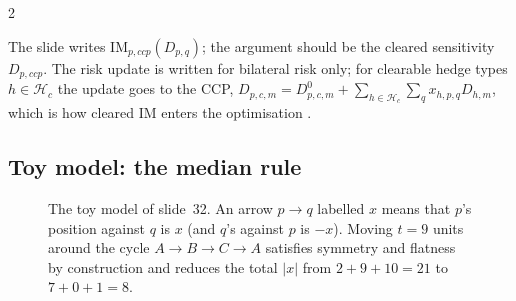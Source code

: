 \begin{paracol}{2}
\begin{coursenote}
The slide writes $\mathrm{IM}_{p,ccp}(D_{p,q})$; the argument should be the cleared sensitivity $D_{p,ccp}$. The
risk update is written for bilateral risk only; for clearable hedge types $h\in\mathcal H_c$ the update goes to the
CCP, $D_{p,c,m}=D^0_{p,c,m}+\sum_{h\in\mathcal H_c}\sum_qx_{h,p,q}D_{h,m}$, which is how cleared IM enters the
optimisation .
\end{coursenote}

\subsection{Toy model: the median rule}
\begin{figure}[ht]
\centering
{}
\caption{The toy model of slide~32. An arrow $p\to q$ labelled $x$ means that $p$'s position against $q$ is $x$
(and $q$'s against $p$ is $-x$). Moving $t=9$ units around the cycle $A\to B\to C\to A$ satisfies symmetry and
flatness by construction and reduces the total $|x|$ from $2+9+10=21$ to $7+0+1=8$.}\label{ch08:fig-triangle}
\end{figure}


\end{paracol}
